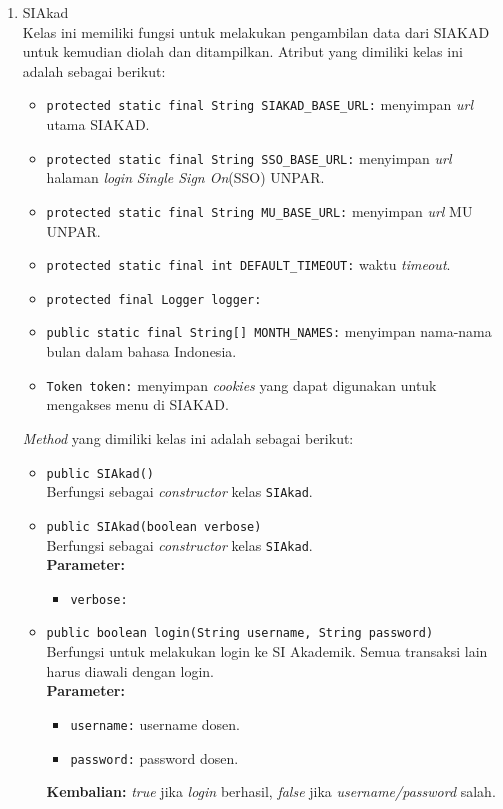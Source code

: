 \begin{enumerate}
\item{SIAkad}\\
Kelas ini memiliki fungsi untuk melakukan pengambilan data dari SIAKAD untuk kemudian diolah dan ditampilkan. Atribut yang dimiliki kelas ini adalah sebagai berikut:
	\begin{itemize}
        \item \texttt{protected static final String SIAKAD\_BASE\_URL:} menyimpan \textit{url} utama SIAKAD.
        \item \texttt{protected static final String SSO\_BASE\_URL:} menyimpan \textit{url} halaman \textit{login} \textit{Single Sign On}(SSO) UNPAR.
        \item \texttt{protected static final String MU\_BASE\_URL:} menyimpan \textit{url} MU UNPAR.
        \item \texttt{protected static final int DEFAULT\_TIMEOUT:} waktu \textit{timeout}.
        \item \texttt{protected final Logger logger:} 
        \item \texttt{public static final String[] MONTH\_NAMES:} menyimpan nama-nama bulan dalam bahasa Indonesia.
        \item \texttt{Token token:} menyimpan \textit{cookies} yang dapat digunakan untuk mengakses menu di SIAKAD.
    \end{itemize}
    
	\textit{Method} yang dimiliki kelas ini adalah sebagai berikut:
	\begin{itemize}
	    \item \texttt{public SIAkad()}\\
	    Berfungsi sebagai \textit{constructor} kelas \texttt{SIAkad}.
	    
	    \item \texttt{public SIAkad(boolean verbose)}\\
	    Berfungsi sebagai \textit{constructor} kelas \texttt{SIAkad}.\\
	    \textbf{Parameter:}
		\begin{itemize}
			\item \texttt{verbose:} 
		\end{itemize}
		
	    \item \texttt{public boolean login(String username, String password)}\\
	    Berfungsi untuk melakukan login ke SI Akademik. Semua transaksi lain harus diawali dengan login.\\
	    \textbf{Parameter:}
		\begin{itemize}
			\item \texttt{username:} username dosen.
			\item \texttt{password:} password dosen.
		\end{itemize}
        \textbf{Kembalian:} \textit{true} jika \textit{login} berhasil, \textit{false} jika \textit{username/password} salah.
        

\end{itemize}
\end{enumerate}
